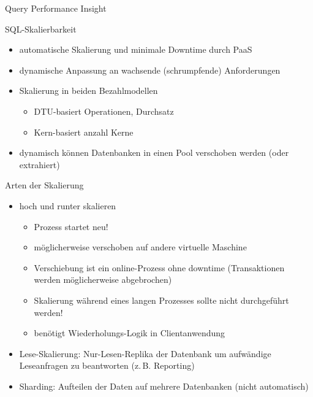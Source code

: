  Query Performance Insight


\begin{flashcard}[Definition]{SQL-Skalierbarkeit}
  \begin{itemize}
    \item automatische Skalierung und minimale Downtime durch PaaS
    \item dynamische Anpassung an wachsende (schrumpfende) Anforderungen
    \item Skalierung in beiden Bezahlmodellen
      \begin{itemize}
        \item DTU-basiert\newline
          Operationen, Durchsatz
        \item Kern-basiert\newline
          anzahl Kerne
      \end{itemize}
    \item dynamisch können Datenbanken in einen Pool verschoben werden\newline
      (oder extrahiert)
  \end{itemize}
\end{flashcard}

\begin{flashcard}[Definition]{Arten der Skalierung}
  \begin{itemize}
    \item hoch und runter skalieren
      \begin{itemize}
        \item Prozess startet neu!
        \item möglicherweise verschoben auf andere virtuelle Maschine
        \item Verschiebung ist ein online-Prozess ohne downtime\newline
          (Transaktionen werden möglicherweise abgebrochen)
        \item Skalierung während eines langen Prozesses sollte nicht durchgeführt werden!
        \item benötigt Wiederholungs-Logik in Clientanwendung
      \end{itemize}
    \item Lese-Skalierung: Nur-Lesen-Replika der Datenbank um aufwändige\newline
      Leseanfragen zu beantworten (z.\,B. Reporting)
    \item Sharding: Aufteilen der Daten auf mehrere Datenbanken\newline
      (nicht automatisch)
  \end{itemize}
\end{flashcard}

